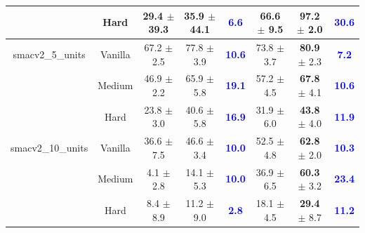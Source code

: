 \begin{table}[htbp]
{\begin{tabular}{c c c c c c c c}
     & Hard & 29.4 \scriptsize$\pm$ 39.3 & 35.9 \scriptsize$\pm$ 44.1 & \textbf{\textcolor{blue}{6.6}} & 66.6 \scriptsize$\pm$ 9.5 & \textbf{97.2} \scriptsize$\pm$ 2.0 & \textbf{\textcolor{blue}{30.6}} \\
    \midrule
    smacv2\_5\_units & Vanilla & 67.2 \scriptsize$\pm$ 2.5 & 77.8 \scriptsize$\pm$ 3.9 & \textbf{\textcolor{blue}{10.6}} & 73.8 \scriptsize$\pm$ 3.7 & \textbf{80.9} \scriptsize$\pm$ 2.3 & \textbf{\textcolor{blue}{7.2}} \\
     & Medium & 46.9 \scriptsize$\pm$ 2.2 & 65.9 \scriptsize$\pm$ 5.8 & \textbf{\textcolor{blue}{19.1}} & 57.2 \scriptsize$\pm$ 4.5 & \textbf{67.8} \scriptsize$\pm$ 4.1 & \textbf{\textcolor{blue}{10.6}} \\
     & Hard & 23.8 \scriptsize$\pm$ 3.0 & 40.6 \scriptsize$\pm$ 5.8 & \textbf{\textcolor{blue}{16.9}} & 31.9 \scriptsize$\pm$ 6.0 & \textbf{43.8} \scriptsize$\pm$ 4.0 & \textbf{\textcolor{blue}{11.9}} \\
    \midrule
    smacv2\_10\_units & Vanilla & 36.6 \scriptsize$\pm$ 7.5 & 46.6 \scriptsize$\pm$ 3.4 & \textbf{\textcolor{blue}{10.0}} & 52.5 \scriptsize$\pm$ 4.8 & \textbf{62.8} \scriptsize$\pm$ 2.0 & \textbf{\textcolor{blue}{10.3}} \\
     & Medium & 4.1 \scriptsize$\pm$ 2.8 & 14.1 \scriptsize$\pm$ 5.3 & \textbf{\textcolor{blue}{10.0}} & 36.9 \scriptsize$\pm$ 6.5 & \textbf{60.3} \scriptsize$\pm$ 3.2 & \textbf{\textcolor{blue}{23.4}} \\
     & Hard & 8.4 \scriptsize$\pm$ 8.9 & 11.2 \scriptsize$\pm$ 9.0 & \textbf{\textcolor{blue}{2.8}} & 18.1 \scriptsize$\pm$ 4.5 & \textbf{29.4} \scriptsize$\pm$ 8.7 & \textbf{\textcolor{blue}{11.2}} \\
\bottomrule
\end{tabular}}
\end{table}